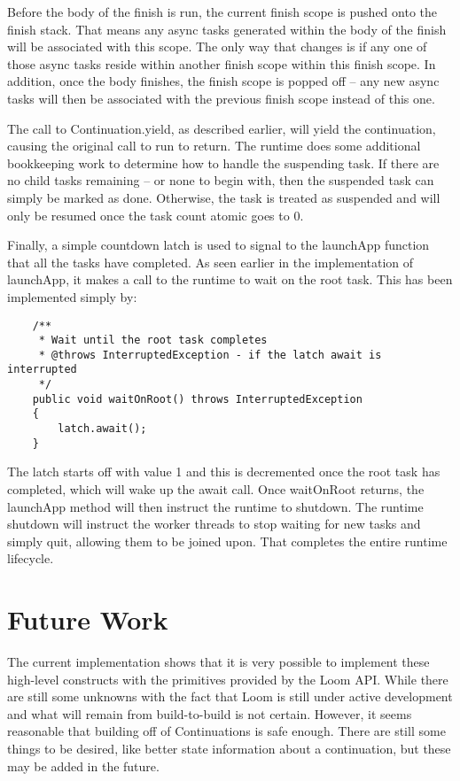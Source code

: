 \documentclass[12pt]{article}
\begin{document}
    Before the body of the finish is run, the current finish scope is pushed onto the finish stack. That
    means any async tasks generated within the body of the finish will be associated with this scope. The
    only way that changes is if any one of those async tasks reside within another finish scope within this
    finish scope. In addition, once the body finishes, the finish scope is popped off -- any new async tasks
    will then be associated with the previous finish scope instead of this one. 

    The call to Continuation.yield, as described earlier, will yield the continuation, causing the original
    call to run to return. The runtime does some additional bookkeeping work to determine how to handle the
    suspending task. If there are no child tasks remaining -- or none to begin with, then the suspended task
    can simply be marked as done. Otherwise, the task is treated as suspended and will only be resumed once
    the task count atomic goes to 0.

    Finally, a simple countdown latch is used to signal to the launchApp function that all the tasks have
    completed. As seen earlier in the implementation of launchApp, it makes a call to the runtime to wait
    on the root task. This has been implemented simply by:

    \begin{lstlisting}
    /**
     * Wait until the root task completes
     * @throws InterruptedException - if the latch await is interrupted
     */
    public void waitOnRoot() throws InterruptedException
    {
        latch.await();
    }
    \end{lstlisting}

    The latch starts off with value 1 and this is decremented once the root task has completed, which will
    wake up the await call. Once waitOnRoot returns, the launchApp method will then instruct the runtime to
    shutdown. The runtime shutdown will instruct the worker threads to stop waiting for new tasks and simply
    quit, allowing them to be joined upon. That completes the entire runtime lifecycle.

    \section{Future Work}

    The current implementation shows that it is very possible to implement these high-level constructs with
    the primitives provided by the Loom API. While there are still some unknowns with the fact that Loom is
    still under active development and what will remain from build-to-build is not certain. However, it seems
    reasonable that building off of Continuations is safe enough. There are still some things to be desired,
    like better state information about a continuation, but these may be added in the future.
\end{document}
